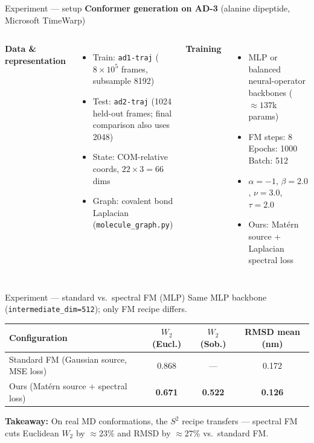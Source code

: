 \documentclass[aspectratio=169,11pt]{beamer}
\begin{document}
\begin{frame}{Experiment --- setup}
  \textbf{Conformer generation on AD-3} (alanine dipeptide, Microsoft TimeWarp)

  \vspace{0.5em}
  \begin{columns}[T,onlytextwidth]
    \textbf{Data \& representation}
    \begin{itemize}\setlength{\itemsep}{0.15em}
      \item Train: \texttt{ad1-traj} ($8{\times}10^5$ frames, subsample 8192)
      \item Test: \texttt{ad2-traj} (1024 held-out frames; final comparison also uses 2048)
      \item State: COM-relative coords, $22{\times}3 = 66$ dims
      \item Graph: covalent bond Laplacian (\texttt{molecule\_graph.py})
    \end{itemize}

    \textbf{Training}
    \begin{itemize}\setlength{\itemsep}{0.15em}
      \item MLP or balanced neural-operator backbones ($\approx 137$k params)
      \item FM steps: 8 \quad Epochs: 1000 \quad Batch: 512
      \item $\alpha{=}{-}1$, $\beta{=}2.0$, $\nu{=}3.0$, $\tau{=}2.0$
      \item Ours: Mat\'ern source + Laplacian spectral loss
    \end{itemize}
  \end{columns}
\end{frame}

\begin{frame}{Experiment --- standard vs.\ spectral FM (MLP)}
  \small
  Same MLP backbone (\texttt{intermediate\_dim=512}); only FM recipe differs.

  \vspace{0.35em}
  \begin{table}
    \centering
    \begin{tabular}{@{}lccc@{}}
      \toprule
      \textbf{Configuration} & \textbf{$W_2$ (Eucl.)} & \textbf{$W_2$ (Sob.)} & \textbf{RMSD mean (nm)} \\
      \midrule
      Standard FM (Gaussian source, MSE loss) & 0.868 & --- & 0.172 \\
      Ours (Mat\'ern source + spectral loss) & \textbf{0.671} & \textbf{0.522} & \textbf{0.126} \\
      \bottomrule
    \end{tabular}
  \end{table}

  \vspace{0.4em}
  \normalsize
  \textbf{Takeaway:} On real MD conformations, the $S^2$ recipe transfers --- spectral FM cuts Euclidean $W_2$ by $\approx 23\%$ and RMSD by $\approx 27\%$ vs.\ standard FM.
\end{frame}
\end{document}
